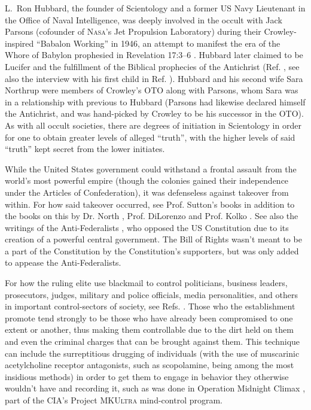 \documentclass[letterpaper,12pt]{article}
\begin{document}
{    L.~Ron Hubbard, the founder of Scientology and a former US Navy Lieutenant in the Office of Naval Intelligence, was deeply involved in the occult with Jack Parsons (cofounder of \textsc{Nasa}'s Jet Propulsion Laboratory) during their Crowley-inspired ``Babalon Working'' in 1946, an attempt to manifest the era of the Whore of Babylon prophesied in Revelation 17:3--6 \cite{Mitchell1969,SundayTimes1969}. Hubbard later claimed to be Lucifer and the fulfillment of the Biblical prophecies of the Antichrist (Ref. , see also the interview with his first child in Ref. ). Hubbard and his second wife Sara Northrup were members of Crowley's OTO along with Parsons, whom Sara was in a relationship with previous to Hubbard (Parsons had likewise declared himself the Antichrist, and was hand-picked by Crowley to be his successor in the OTO). As with all occult societies, there are degrees of initiation in Scientology in order for one to obtain greater levels of alleged ``truth'', with the higher levels of said ``truth'' kept secret from the lower initiates.\par
    While the United States government could withstand a frontal assault from the world's most powerful empire (though the colonies gained their independence under the Articles of Confederation), it was defenseless against takeover from within. For how said takeover occurred, see Prof. Sutton's books \cite{Sutton1968,Sutton1971,Sutton1973,Sutton1973b,Sutton1974,Sutton1976,Sutton1984,Sutton1986,Sutton1995} in addition to the books on this by Dr. North \cite{North2004}, Prof. DiLorenzo \cite{DiLorenzo2008} and Prof. Kolko \cite{Kolko1963,Kolko1965}. See also the writings of the Anti-Federalists \cite{StoringDry1981}, who opposed the US Constitution due to its creation of a powerful central government. The Bill of Rights wasn't meant to be a part of the Constitution by the Constitution's supporters, but was only added to appease the Anti-Federalists.\par
    For how the ruling elite use blackmail to control politicians, business leaders, prosecutors, judges, military and police officials, media personalities, and others in important control-sectors of society, see Refs. . Those who the establishment promote tend strongly to be those who have already been compromised to one extent or another, thus making them controllable due to the dirt held on them and even the criminal charges that can be brought against them. This technique can include the surreptitious drugging of individuals (with the use of muscarinic acetylcholine receptor antagonists, such as scopolamine, being among the most insidious methods) in order to get them to engage in behavior they otherwise wouldn't have and recording it, such as was done in Operation Midnight Climax \cite{Time1977-8-15,UPI1977-8-27}, part of the CIA's Project \textsc{MKUltra} mind-control program.}
\end{document}
